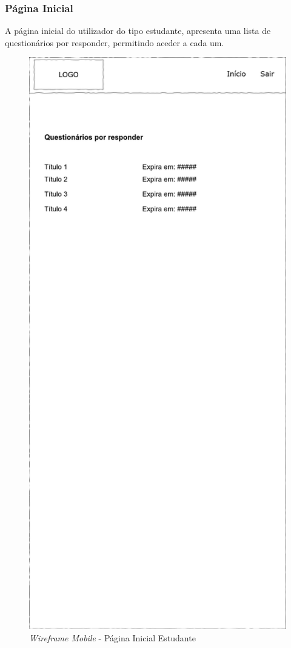 \documentclass[12pt,a4paper,final]{article}
\begin{document}
    \subsubsection{Página Inicial}
    A página inicial do utilizador do tipo estudante, apresenta uma lista de questionários por responder, permitindo aceder a cada um.

    \begin{figure}[H]
        \centering
        \includegraphics[width=\textwidth,height=0.9\textheight,keepaspectratio]{wireframes/questionarios.wireframes-estudante-geral-mobile.drawio}
        \caption{\textit{Wireframe Mobile} - Página Inicial Estudante}
        \label{fig:wm-pie}
    \end{figure}
\end{document}
